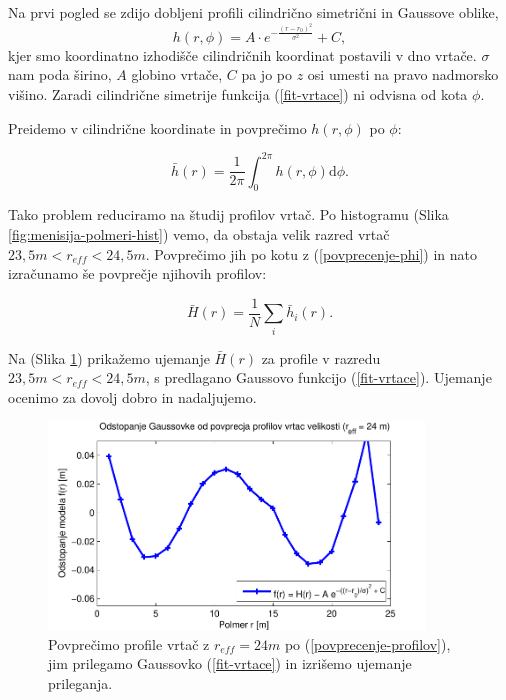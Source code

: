 \documentclass[a4paper, twoside, 12pt]{book}
\begin{document}
Na prvi pogled se zdijo dobljeni profili cilindrično simetrični in Gaussove oblike,
\begin{equation}
  h(r,\phi) = A \cdot e^{-\frac{(r-r_0)^2}{\sigma^2}} + C,
  \label{fit-vrtace}
\end{equation}
kjer smo koordinatno izhodišče cilindričnih koordinat postavili v dno vrtače. $\sigma$ nam poda širino, $A$ globino vrtače, $C$ pa jo po $z$ osi umesti na pravo nadmorsko višino. Zaradi cilindrične simetrije funkcija (\ref{fit-vrtace}) ni odvisna od kota $\phi$.

Preidemo v cilindrične koordinate in povprečimo $h(r,\phi)$ po $\phi$:

\begin{equation} 
  \bar h(r) = \frac{1}{2 \pi} \int_0^{2\pi} h(r,\phi) \mathrm{d}\phi.
  \label{povprecenje-phi}
\end{equation}

Tako problem reduciramo na študij profilov vrtač.
Po histogramu (Slika \ref{fig:menisija-polmeri-hist}) vemo, da obstaja velik razred vrtač $23,5m < r_{eff} < 24,5m$. Povprečimo jih po kotu z (\ref{povprecenje-phi}) in nato izračunamo še povprečje njihovih profilov:

\begin{equation} 
  \bar H(r) = \frac{1}{N} \sum_{i} \bar h_i(r).
  \label{povprecenje-profilov}
\end{equation}

Na (Slika \ref{fig:menisija-profil-21-fit}) prikažemo ujemanje $\bar H(r)$ za profile v razredu $23,5m<r_{eff}<24,5m$, s predlagano Gaussovo  funkcijo (\ref{fit-vrtace}). Ujemanje ocenimo za dovolj dobro in nadaljujemo.

  \begin{figure}[h!]
    \begin{center}
      \includegraphics[width=10cm]{slike/menisija-profil-21-fit}
    \end{center}
    \caption{Povprečimo profile vrtač z $r_{eff}=24m$ po (\ref{povprecenje-profilov}), jim prilegamo Gaussovko (\ref{fit-vrtace}) in izrišemo ujemanje prileganja.}
    \label{fig:menisija-profil-21-fit}
  \end{figure}
\end{document}
